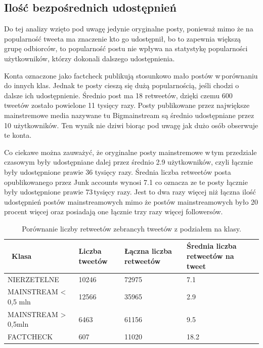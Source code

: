 \subsection{Ilość bezpośrednich udostępnień }
Do tej analizy wzięto pod uwagę jedynie oryginalne posty, ponieważ mimo że na popularność tweeta ma znaczenie kto go udostępnił, bo to zapewnia większą grupę odbiorców, to popularność postu nie wpływa na statystykę popularności użytkowników, którzy dokonali dalszego udostępnienia. 
\par
Konta oznaczone jako factcheck publikują stosunkowo mało postów w\,porównaniu do innych klas. Jednak te posty cieszą się dużą popularnością, jeśli chodzi o dalsze ich udostępnienie. Średnio post ma 18 retweetów, dzięki czemu 600 tweetów zostało powielone 11 tysięcy razy. Posty publikowane przez największe mainstremowe media nazywane tu Bigmainstream są średnio udostępniane przez 10 użytkowników. Ten wynik nie dziwi biorąc pod uwagę jak dużo osób obserwuje te konta.  
\par
Co ciekawe można zauważyć, że oryginalne posty mainstremowe w\,tym przedziale czasowym były udostępniane dalej przez średnio 2.9 użytkowników, czyli łącznie były udostępnione prawie 36 tysięcy razy. Średnia liczba retweetów posta opublikowanego przez Junk accounts wynosi 7.1 co oznacza ze te posty łącznie były udostępnione prawie 73\,tysięcy razy. Jest to dwa razy więcej niż łączna ilość udostępnień postów mainstreamowych mimo że postów mainstreamowych było 20 procent więcej oraz posiadają one łącznie trzy razy więcej followersów. 


\begin{table}[!h]
\centering
\caption{Porównanie liczby retweetów zebrancyh tweetów z podziałem na klasy.} \label{tab:liczbaretweetow}
\begin{tabular}{|m{}|R{2,5cm}|R{2,5cm}|R{2,5cm}|}  
\hline
~Klasa & Liczba tweetów & Łączna liczba retweetów & Średnia liczba retweetów na tweet \\ 
\hline
NIERZETELNE & 10246 & 72975 & 7.1 \\ 
\hline
MAINSTREAM \textless{} 0,5 mln & 12566 & 35965 & 2.9 \\ 
\hline
MAINSTREAM \textgreater{} 0,5mln & 6463 & 61156 & 9.5 \\ 
\hline
FACTCHECK & 607 & 11020 & 18.2 \\
\hline
\end{tabular}
\end{table}

